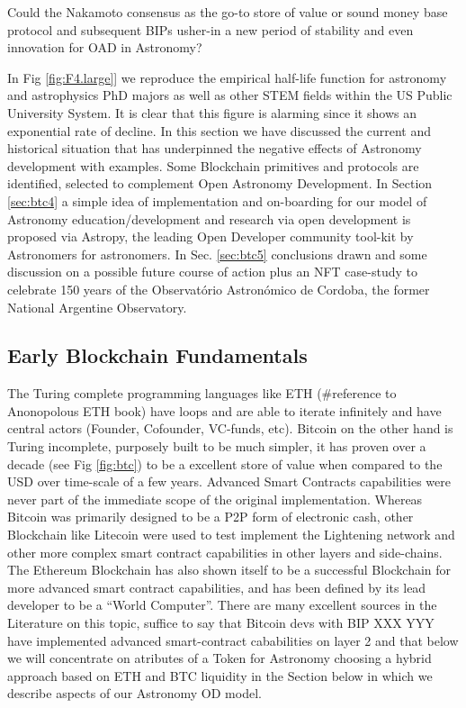 \documentclass[final,5p,times,twocolumn,authoryear]{elsarticle}
\begin{document}
Could the Nakamoto consensus as the go-to store of value or sound money base protocol and subsequent BIPs usher-in a new period of stability and even innovation for OAD in Astronomy? 

In Fig \ref{fig:F4.large}] we reproduce the empirical half-life function for astronomy and astrophysics PhD majors as well as other STEM fields within the US Public University System. It is clear that this figure is alarming since it shows an exponential rate of decline.  In this section we have discussed the current and historical situation that has underpinned the negative effects of Astronomy development with examples. Some Blockchain primitives and protocols are identified, selected to complement Open Astronomy Development.  In Section \ref{sec:btc4} a simple idea of implementation and on-boarding for our model of Astronomy education/development and research via open development is proposed via Astropy, the leading Open Developer community tool-kit by Astronomers for astronomers. In Sec. \ref{sec:btc5} conclusions drawn and some discussion on a possible future course of action plus an NFT case-study to celebrate 150 years of the Observat\'orio Astron\'omico de Cordoba, the former National Argentine Observatory. 

\subsection{Early Blockchain Fundamentals}
\label{subsec:fundamentals}

The Turing complete programming languages like ETH (#reference to Anonopolous ETH book) have loops and are able to iterate infinitely and have central actors (Founder, Cofounder, VC-funds, etc). Bitcoin on the other hand is Turing incomplete, purposely built to be much simpler, it has proven over a decade (see Fig \ref{fig:btc}) to be a excellent store of value when compared to the USD over time-scale of a few years. Advanced Smart Contracts capabilities were never part of the immediate scope of the original implementation. Whereas Bitcoin was primarily designed to be a P2P form of electronic cash, other Blockchain like Litecoin were used to test implement the Lightening network and other more complex smart contract capabilities in other layers and side-chains. The Ethereum Blockchain has also shown itself to be a successful Blockchain for more advanced smart contract capabilities, and has been defined by its lead developer to be a “World Computer”. There are many excellent sources in the Literature on this topic, suffice to say that Bitcoin devs with BIP XXX YYY have implemented advanced smart-contract cababilities on layer 2 and that below we will concentrate on atributes of a Token for Astronomy choosing a hybrid approach based on ETH and BTC liquidity in the Section below in which we describe aspects of our Astronomy OD model.
 
\end{document}
